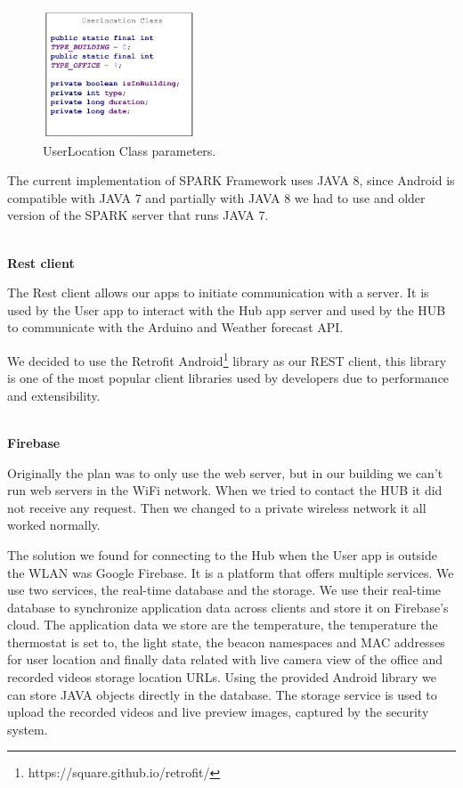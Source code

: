 \begin{figure}[h]
\centering
\includegraphics[width=0.4\textwidth]{Figures/userlocation_class}
\caption{UserLocation Class parameters.}
\label{user_location_class}
\end{figure}

The current implementation of SPARK Framework uses JAVA 8, since Android is compatible with JAVA 7 and partially with JAVA 8 we had to use and older version of the SPARK server that runs JAVA 7.  

\mbox{}\\
\textbf{Rest client}

The Rest client allows our apps to initiate communication with a server. It is used by the User app to interact with the Hub app server and used by the HUB to communicate with the Arduino and Weather forecast API.

We decided to use the Retrofit Android\footnote{https://square.github.io/retrofit/}  library as our \ac{REST} client, this library is one of the most popular client libraries used by developers due to performance and extensibility.



\mbox{}\\
\textbf{Firebase}

Originally the plan was to only use the web server, but in our building we can't run web servers in the WiFi network. When we tried to contact the HUB it did not receive any request. Then we changed to a private wireless network it all worked normally.

The solution we found for connecting  to the Hub when the User app is outside the \ac{WLAN} was Google Firebase. It is a platform that offers multiple services. We use two services, the real-time database and the storage.
We use their real-time database to synchronize application data across clients and store it on Firebase's cloud. The application data we store are the temperature, the temperature the thermostat is set to, the light state, the beacon namespaces and MAC addresses for user location and finally data related with live camera view of the office and recorded videos storage location URLs. Using the provided Android library we can store JAVA objects directly in the database. The storage service is used to upload the recorded videos and live preview images, captured by the security system.

